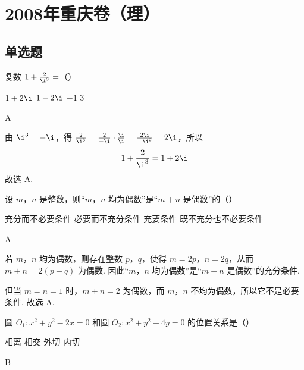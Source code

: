 \chapter{2008年重庆卷（理）}

\section{单选题}

\begin{problem}
复数 \(1 + \frac{2}{\i^3} =\)（\quad）

\choices
    {\(1 + 2\i\)}
    {\(1 - 2\i\)}
    {\(-1\)}
    {\(3\)}
\end{problem}

\begin{answer}
A
\end{answer}

\begin{solution}
由 \(\i^{3}=-\i\)，得 \(\frac{2}{\i^{3}}=\frac{2}{-\i}\cdot\frac{\i}{\i}=\frac{2\i}{-\i^{2}}=2\i\)，所以
\[
1+\frac{2}{\i^{3}}=1+2\i
\]
故选 A.
\end{solution}

\begin{problem}
设 \(m\)，\(n\) 是整数，则“\(m\)，\(n\) 均为偶数”是“\(m + n\) 是偶数”的（\quad）

\choices
    {充分而不必要条件}
    {必要而不充分条件}
    {充要条件}
    {既不充分也不必要条件}
\end{problem}

\begin{answer}
A
\end{answer}

\begin{solution}
若 \(m\)，\(n\) 均为偶数，则存在整数 \(p\)，\(q\)，使得 \(m=2p\)，\(n=2q\)，从而 \(m+n=2(p+q)\) 为偶数. 因此“\(m\)，\(n\) 均为偶数”是“\(m+n\) 是偶数”的充分条件.

但当 \(m=n=1\) 时，\(m+n=2\) 为偶数，而 \(m\)，\(n\) 不均为偶数，所以它不是必要条件. 故选 A.
\end{solution}

\begin{problem}
圆 \(O_{1}: x^{2} + y^{2} - 2x = 0\) 和圆 \(O_{2}: x^{2} + y^{2} - 4y = 0\) 的位置关系是（\quad）

\choices
    {相离}
    {相交}
    {外切}
    {内切}
\end{problem}

\begin{answer}
B
\end{answer}

